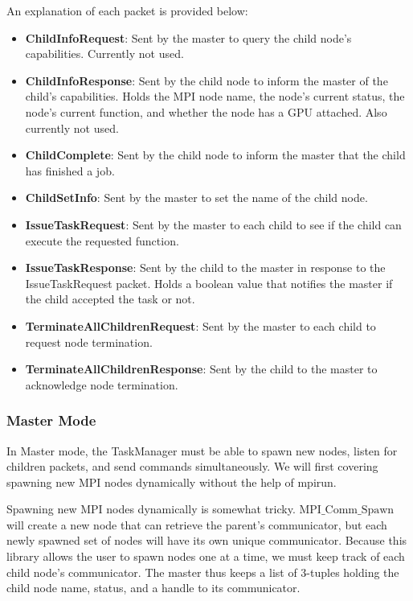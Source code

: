 \documentclass[11pt]{article}
\begin{document}
                An explanation of each packet is provided below:
                \begin{itemize}
                    \item \textbf{ChildInfoRequest}: Sent by the master to query the child node's capabilities.
                    Currently not used.
                    \item \textbf{ChildInfoResponse}: Sent by the child node to inform the master of the child's 
                    capabilities. Holds the MPI node name, the node's current status, the node's current
                    function, and whether the node has a GPU attached. Also currently not used.
                    \item \textbf{ChildComplete}: Sent by the child node to inform the master that the child
                    has finished a job.
                    \item \textbf{ChildSetInfo}: Sent by the master to set the name of the child node.
                    \item \textbf{IssueTaskRequest}: Sent by the master to each child to see if the child
                    can execute the requested function.
                    \item \textbf{IssueTaskResponse}: Sent by the child to the master in response to the 
                    IssueTaskRequest packet. Holds a boolean value that notifies the master if the child
                    accepted the task or not.
                    \item \textbf{TerminateAllChildrenRequest}: Sent by the master to each child to request
                    node termination.
                    \item \textbf{TerminateAllChildrenResponse}: Sent by the child to the master to acknowledge 
                    node termination. 
                \end{itemize} 
            
            \subsubsection{Master Mode}
                In Master mode, the TaskManager must be able to spawn new nodes, listen for children packets,
                and send commands simultaneously. We will first covering spawning new MPI nodes dynamically
                without the help of mpirun.
                
                Spawning new MPI nodes dynamically is somewhat tricky. $\text{MPI\_Comm\_Spawn}$ will create a new
                node that can retrieve the parent's communicator, but each newly spawned set of nodes will have its
                own unique communicator. Because this library allows the user to spawn nodes one at a time, we must
                keep track of each child node's communicator. The master thus keeps a list of 3-tuples
                holding the child node name, status, and a handle to its communicator.
                
\end{document}
